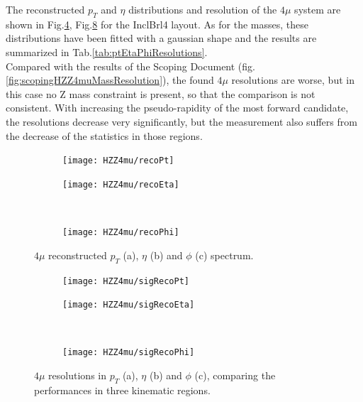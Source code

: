 \documentclass[a4paper,twoside,12pt]{article}
\begin{document}
The reconstructed $p_T$ and $\eta$ distributions and resolution of the $4\mu$ system 
are shown in Fig.\ref{fig:HZZ4mu:recoPtEtaPhi}, Fig.\ref{fig:HZZ4mu:sigRecoPtEtaPhi} for the
InclBrl4 layout. As for the masses, these distributions have been fitted with a gaussian shape
and the results are summarized in Tab.\ref{tab:ptEtaPhiResolutions}. \\

Compared with the results of the Scoping Document (fig.\ref{fig:scopingHZZ4muMassResolution}), the found $4\mu$ resolutions
are worse, but in this case no Z mass constraint is present, so that the comparison
is not consistent. With increasing the pseudo-rapidity of the most forward candidate,
the resolutions decrease very significantly, but the measurement also suffers from the
decrease of the statistics in those regions.

\begin{figure}
\begin{subfigure}{.5\linewidth}
\texttt{[image: HZZ4mu/recoPt]}
\caption{}
\label{fig:HZZ4mu:recoPt}
\end{subfigure}
\begin{subfigure}{.5\linewidth}
\centering
\texttt{[image: HZZ4mu/recoEta]}
\caption{}
\label{fig:HZZ4mu:recoEta}
\end{subfigure}\\[1ex]
\begin{subfigure}{\linewidth}
\centering
\texttt{[image: HZZ4mu/recoPhi]}
\caption{}
\label{fig:HZZ4mu:recoPhi}
\end{subfigure}
\caption{$4\mu$ reconstructed $p_{T}$ (a), $\eta$ (b) and $\phi$ (c) spectrum.}
\label{fig:HZZ4mu:recoPtEtaPhi}
\end{figure}

\begin{figure}
\begin{subfigure}{.5\linewidth}
\texttt{[image: HZZ4mu/sigRecoPt]}
\caption{}
\label{fig:HZZ4mu:sigRecoPt}
\end{subfigure}
\begin{subfigure}{.5\linewidth}
\centering
\texttt{[image: HZZ4mu/sigRecoEta]}
\caption{}
\label{fig:HZZ4mu:sigRecoEta}
\end{subfigure}\\[1ex]
\begin{subfigure}{\linewidth}
\centering
\texttt{[image: HZZ4mu/sigRecoPhi]}
\caption{}
\label{fig:HZZ4mu:sigRecoPhi}
\end{subfigure}
\caption{$4\mu$ resolutions in $p_{T}$ (a), $\eta$ (b) and $\phi$ (c), comparing
	the performances in three kinematic regions.}
\label{fig:HZZ4mu:sigRecoPtEtaPhi}
\end{figure}
\end{document}
